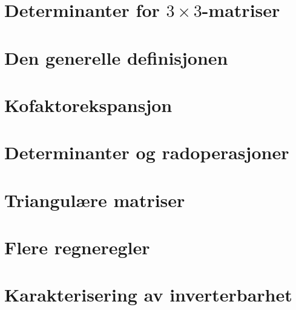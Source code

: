 \section*{Determinanter for $3 \times 3$-matriser}



\section*{Den generelle definisjonen}



\section*{Kofaktorekspansjon}



\section*{Determinanter og radoperasjoner}



\section*{Triangulære matriser}



\section*{Flere regneregler}



\section*{Karakterisering av inverterbarhet}


\kapittelslutt

